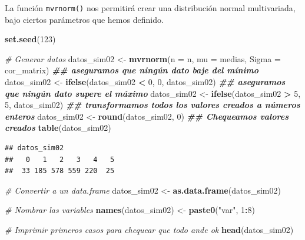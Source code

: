 \documentclass[
]{book}
\newenvironment{Shaded}{\begin{snugshade}}{\end{snugshade}}
\newcommand{\AttributeTok}[1]{\textcolor[rgb]{0.13,0.29,0.53}{#1}}
\newcommand{\CommentTok}[1]{\textcolor[rgb]{0.56,0.35,0.01}{\textit{#1}}}
\newcommand{\DecValTok}[1]{\textcolor[rgb]{0.00,0.00,0.81}{#1}}
\newcommand{\DocumentationTok}[1]{\textcolor[rgb]{0.56,0.35,0.01}{\textbf{\textit{#1}}}}
\newcommand{\FunctionTok}[1]{\textcolor[rgb]{0.13,0.29,0.53}{\textbf{#1}}}
\newcommand{\NormalTok}[1]{#1}
\newcommand{\OtherTok}[1]{\textcolor[rgb]{0.56,0.35,0.01}{#1}}
\newcommand{\SpecialCharTok}[1]{\textcolor[rgb]{0.81,0.36,0.00}{\textbf{#1}}}
\newcommand{\StringTok}[1]{\textcolor[rgb]{0.31,0.60,0.02}{#1}}
\begin{document}
La función \texttt{mvrnorm()} nos permitirá crear una distribución normal multivariada, bajo ciertos parámetros que hemos definido.

\begin{Shaded}
\begin{Highlighting}[]
\FunctionTok{set.seed}\NormalTok{(}\DecValTok{123}\NormalTok{)}

\CommentTok{\# Generar datos}
\NormalTok{datos\_sim02 }\OtherTok{\textless{}{-}} \FunctionTok{mvrnorm}\NormalTok{(}\AttributeTok{n =}\NormalTok{ n, }\AttributeTok{mu =}\NormalTok{ medias, }\AttributeTok{Sigma =}\NormalTok{ cor\_matrix)}
\DocumentationTok{\#\# aseguramos que ningún dato baje del mínimo}
\NormalTok{datos\_sim02 }\OtherTok{\textless{}{-}} \FunctionTok{ifelse}\NormalTok{(datos\_sim02 }\SpecialCharTok{\textless{}} \DecValTok{0}\NormalTok{, }\DecValTok{0}\NormalTok{, datos\_sim02)}
\DocumentationTok{\#\# aseguramos que ningún dato supere el máximo}
\NormalTok{datos\_sim02 }\OtherTok{\textless{}{-}} \FunctionTok{ifelse}\NormalTok{(datos\_sim02 }\SpecialCharTok{\textgreater{}} \DecValTok{5}\NormalTok{, }\DecValTok{5}\NormalTok{, datos\_sim02)}
\DocumentationTok{\#\# transformamos todos los valores creados a números enteros}
\NormalTok{datos\_sim02 }\OtherTok{\textless{}{-}} \FunctionTok{round}\NormalTok{(datos\_sim02, }\DecValTok{0}\NormalTok{)}
\DocumentationTok{\#\# Chequeamos valores creados}
\FunctionTok{table}\NormalTok{(datos\_sim02)}
\end{Highlighting}
\end{Shaded}

\begin{verbatim}
## datos_sim02
##   0   1   2   3   4   5 
##  33 185 578 559 220  25
\end{verbatim}

\begin{Shaded}
\begin{Highlighting}[]
\CommentTok{\# Convertir a un data.frame}
\NormalTok{datos\_sim02 }\OtherTok{\textless{}{-}} \FunctionTok{as.data.frame}\NormalTok{(datos\_sim02)}

\CommentTok{\# Nombrar las variables}
\FunctionTok{names}\NormalTok{(datos\_sim02) }\OtherTok{\textless{}{-}} \FunctionTok{paste0}\NormalTok{(}\StringTok{"var"}\NormalTok{, }\DecValTok{1}\SpecialCharTok{:}\DecValTok{8}\NormalTok{)}

\CommentTok{\# Imprimir primeros casos para chequear que todo ande ok}
\FunctionTok{head}\NormalTok{(datos\_sim02)}
\end{Highlighting}
\end{Shaded}
\end{document}
